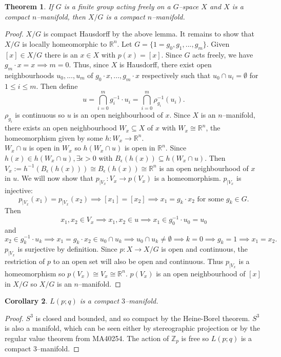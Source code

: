 \documentclass{article}
\newtheorem{theorem}{Theorem}[section]
\newtheorem{corollary}[theorem]{Corollary}
\begin{document}
\begin{theorem}
If $G$ is a finite group acting freely on a $G$--space $X$ and $X$ is a compact $n$--manifold, then $X/G$ is a compact $n$--manifold.
\end{theorem}
\begin{proof}
$X/G$ is compact Hausdorff by the above lemma. It remains to show that $X/G$ is locally homeomorphic to $\mathbb{R}^n$. Let $G=\{1=g_0,g_1,...,g_m\}$. Given $[x]\in X/G$ there is an $x\in X$ with $p(x)=[x]$. Since $G$ acts freely, we have $g_m\cdot x=x\implies m=0$. Thus, since $X$ is Hausdorff, there exist open neighbourhoods $u_0,...,u_m$ of $g_0\cdot x,...,g_m\cdot x$ respectively such that $u_0\cap u_i=\emptyset$ for $1\leq i\leq m$. Then define \[u=\bigcap_{i=0}^mg_i^{-1}\cdot u_i=\bigcap_{i=0}^m\rho_{g_i}^{-1}(u_i).\] $\rho_{g_i}$ is continuous so $u$ is an open neighbourhood of $x$. Since $X$ is an $n$--manifold, there exists an open neighbourhood $W_x\subseteq X$ of $x$ with $W_x\cong\mathbb{R}^n$, the homeomorphism given by some $h:W_x\to \mathbb{R}^n$.\\ $W_x\cap u$ is open in $W_x$ so $h(W_x\cap u)$ is open in $\mathbb{R}^n$. Since $h(x)\in h(W_x\cap u),\exists\epsilon>0$ with $B_\epsilon(h(x))\subseteq h(W_x\cap u)$. Then $V_x:=h^{-1}(B_\epsilon (h(x)))\cong B_\epsilon(h(x))\cong\mathbb{R}^n$ is an open neighbourhood of $x$ in $u$. We will now show that $p_{|V_x}:V_x\to p(V_x)$ is a homeomorphism. $p_{|V_x}$ is injective: \[p_{|V_x}(x_1)=p_{|V_x}(x_2)\implies[x_1]=[x_2]\implies x_1=g_k\cdot x_2\text{ for some }g_k\in G.\] Then \[x_1,x_2\in V_x\implies x_1,x_2\in u\implies x_1\in g_0^{-1}\cdot u_0=u_0\] and \[x_2\in g_k^{-1}\cdot u_k\implies x_1=g_k\cdot x_2\in u_0\cap u_k\implies u_0\cap u_k\neq \emptyset\implies k=0\implies g_k=1\implies x_1=x_2.\]
$p_{|V_x}$ is surjective by definition. Since $p:X\to X/G$ is open and continuous, the restriction of $p$ to an open set will also be open and continuous. Thus $p_{|V_x}$ is a homeomorphism so $p(V_x)\cong V_x\cong\mathbb{R}^n$. $p(V_x)$ is an open neighbourhood of $[x]$ in $X/G$ so $X/G$ is an $n$--manifold.
\end{proof}
\begin{corollary}
$L(p;q)$ is a compact $3$--manifold.
\end{corollary}
\begin{proof}
$S^3$ is closed and bounded, and so compact by the Heine-Borel theorem. $S^3$ is also a manifold, which can be seen either by stereographic projection or by the regular value theorem from MA40254. The action of $\mathbb{Z}_p$ is free so $L(p;q)$ is a compact $3$--manifold.
\end{proof}
\end{document}
